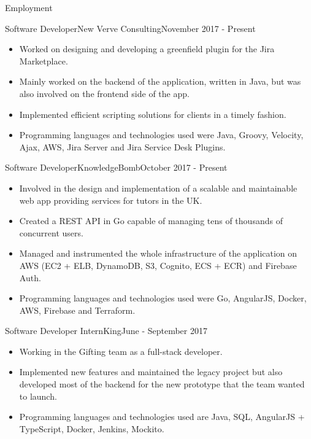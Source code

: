 \documentclass[]{cv}
\begin{document}
	\makeheader
	
	\begin{cvsection}{Employment}
		\begin{cvsubsection}{Software Developer}{New Verve Consulting}{November 2017 - Present}
			\begin{itemize}
				\item Worked on designing and developing a greenfield plugin for the Jira Marketplace.
				\item Mainly worked on the backend of the application, written in Java, but was also involved 
				on the frontend side of the app.
				\item Implemented efficient scripting solutions for clients in a timely fashion.
				\item Programming languages and technologies used were Java, Groovy, Velocity, Ajax, AWS, 
				Jira Server and Jira Service Desk Plugins.
			\end{itemize}
		\end{cvsubsection}
		
		\begin{cvsubsection}{Software Developer}{KnowledgeBomb}{October 2017 - Present}	
			\begin{itemize}
				\item Involved in the design and implementation of a scalable and maintainable web app 
				providing services for tutors in the UK.
				\item Created a REST API in Go capable of managing tens of thousands of concurrent users.
				\item Managed and instrumented the whole infrastructure of the application on AWS (EC2 + ELB, DynamoDB, S3, Cognito, ECS + ECR)
				and Firebase Auth.
				\item Programming languages and technologies used were Go, AngularJS, Docker, AWS, Firebase and Terraform.
			\end{itemize}
		\end{cvsubsection}
		
		\begin{cvsubsection}{Software Developer Intern}{King}{June - September 2017}		
			\begin{itemize}
				\item Working in the Gifting team as a full-stack developer.
				\item Implemented new features and maintained the legacy project but also developed most of the backend for the new prototype that the team wanted to launch.
				\item Programming languages and technologies used are Java, SQL, AngularJS + TypeScript, Docker, Jenkins, Mockito.
			\end{itemize}
		\end{cvsubsection}
		

\end{cvsection}
\end{document}
